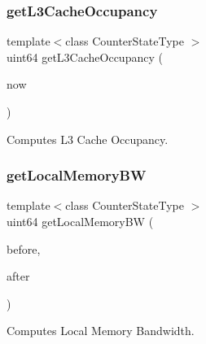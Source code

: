 \subsubsection{\texorpdfstring{get\+L3\+Cache\+Occupancy}{getL3CacheOccupancy}}
{\footnotesize\ttfamily template$<$class Counter\+State\+Type $>$ \\
uint64 get\+L3\+Cache\+Occupancy (\begin{DoxyParamCaption}\item[{const Counter\+State\+Type \&}]{now }\end{DoxyParamCaption})\hspace{0.3cm}{\ttfamily [friend]}}



Computes L3 Cache Occupancy. 

\mbox{\label{class_basic_counter_state_a3ba7c9267c6e0f338a59defc98ae0007}} 
\subsubsection{\texorpdfstring{get\+Local\+Memory\+BW}{getLocalMemoryBW}}
{\footnotesize\ttfamily template$<$class Counter\+State\+Type $>$ \\
uint64 get\+Local\+Memory\+BW (\begin{DoxyParamCaption}\item[{const Counter\+State\+Type \&}]{before,  }\item[{const Counter\+State\+Type \&}]{after }\end{DoxyParamCaption})\hspace{0.3cm}{\ttfamily [friend]}}



Computes Local Memory Bandwidth. 

\mbox{\label{class_basic_counter_state_abaa9d828b52f41866bf7dc8ff491a62e}} 
